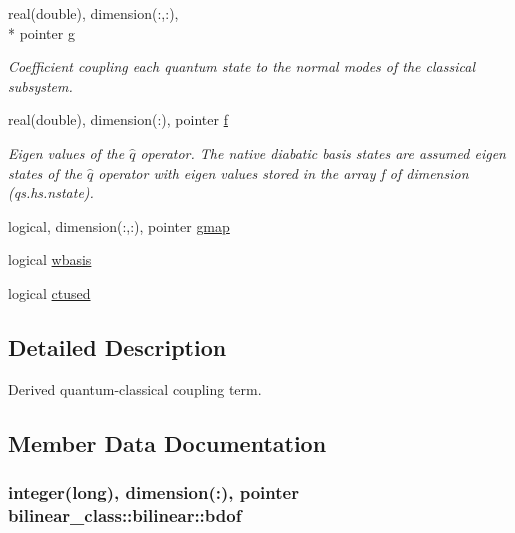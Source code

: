 \begin{DoxyCompactItemize}
real(double), dimension(\+:,\+:), \\*
pointer \hyperlink{structbilinear__class_1_1bilinear_a910401429e7649dba49acbab872a1b75}{g}
\begin{DoxyCompactList}\small\item\em Coefficient coupling each quantum state to the normal modes of the classical subsystem. \end{DoxyCompactList}\item 
real(double), dimension(\+:), pointer \hyperlink{structbilinear__class_1_1bilinear_a809699845e36e344b7aeb51642c333ec}{f}
\begin{DoxyCompactList}\small\item\em Eigen values of the $ \hat q $ operator. The native diabatic basis states are assumed eigen states of the $ \hat q $ operator with eigen values stored in the array f of dimension (qs.\+hs.\+nstate). \end{DoxyCompactList}\item 
logical, dimension(\+:,\+:), pointer \hyperlink{structbilinear__class_1_1bilinear_aeb06e78f97c5cdac0c83422ec087e2e0}{gmap}
\item 
logical \hyperlink{structbilinear__class_1_1bilinear_a78eec2ff8a3e1de38eb02ceeb108ad15}{wbasis}
\item 
logical \hyperlink{structbilinear__class_1_1bilinear_aba7556e23595f003ffcf20327dc18f3e}{ctused}
\end{DoxyCompactItemize}


\subsection{Detailed Description}
Derived quantum-\/classical coupling term. 

\subsection{Member Data Documentation}
\hypertarget{structbilinear__class_1_1bilinear_a78e65d82cd358d5dfa19b780ab877fa0}{
\subsubsection[{bdof}]{\setlength{\rightskip}{0pt plus 5cm}integer(long), dimension(\+:), pointer bilinear\+\_\+class\+::bilinear\+::bdof\hspace{0.3cm}{\ttfamily [private]}}}\label{structbilinear__class_1_1bilinear_a78e65d82cd358d5dfa19b780ab877fa0}


